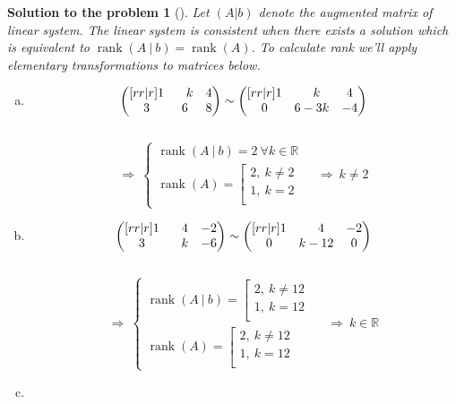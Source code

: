 \documentclass[12pt,a4]{article}
\newtheorem{solution}{Solution to the problem}
\newcommand\rank{\operatorname{rank}}
\begin{document}
\begin{solution}[]\rm Let $(A|b)$ denote the augmented matrix of linear system. The linear system is consistent when there exists a solution which is equivalent to $\rank(A~|~b) = \rank(A)$. To calculate rank we'll apply elementary transformations to matrices below.
\begin{enumerate}[(a)]
\item
\[
\begin{pmatrix}[rr|r]
1 & \hphantom{-}k & 4 \\
3 & 6 & 8
\end{pmatrix} \sim
\begin{pmatrix}[rr|r]
1 & \hphantom{-}k & 4 \\
0 & 6-3k & -4
\end{pmatrix} 
\]\\
\[
\Rightarrow ~
\left\{\begin{matrix}
\rank(A~|~b) = 2~\forall k \in \mathbb{R} \\[4pt]
\rank(A) = 
\left[\begin{matrix}
2,~k \neq 2\\
1,~k = 2 \\
\end{matrix}\right.
\end{matrix}\right. \quad
\Rightarrow~k \neq 2
\]
\item
\[
\begin{pmatrix}[rr|r]
1 & \hphantom{-}4 & -2 \\
3 & \hphantom{-}k & -6
\end{pmatrix}
\sim
\begin{pmatrix}[rr|r]
1 & \hphantom{-}4 & -2 \\
0 & k-12 & 0
\end{pmatrix} 
\]\\
\[
\Rightarrow ~
\left\{\begin{matrix}
\rank(A~|~b) = 
\left[\begin{matrix}
2,~k \neq 12 \\
1,~k = 12 \\
\end{matrix}\right.\\[12pt]
\rank(A) = 
\left[\begin{matrix}
2,~k \neq 12 \\
1,~k = 12 \\
\end{matrix}\right.
\end{matrix}\right. \quad
\Rightarrow~k \in \mathbb{R}
\]
\item

\end{enumerate}
\end{solution}
\end{document}

